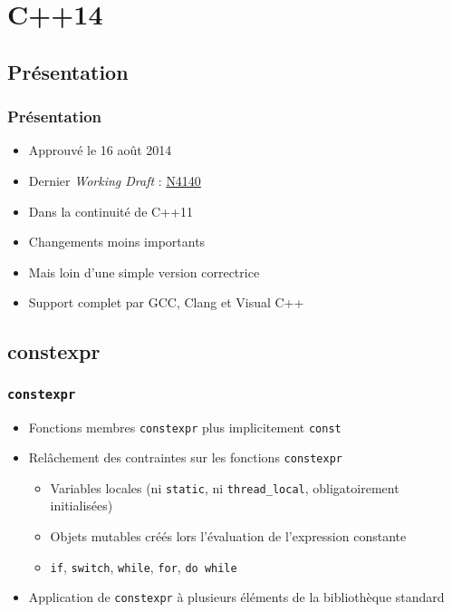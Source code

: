 \documentclass[C++.tex]{subfiles}
\begin{document}
\section{C++14}
\subsection*{Présentation}
\begin{frame}
	\frametitle{Présentation}
	\begin{itemize}
		\item Approuvé le 16 août 2014
		\item Dernier \textit{Working Draft} : \href{https://timsong-cpp.github.io/cppwp/n4140/draft.pdf}{N4140}
		\item Dans la continuité de C++11
		\item Changements moins importants
		\item Mais loin d'une simple version correctrice
		\item Support complet par GCC, Clang et Visual C++
	\end{itemize}
\end{frame}

\subsection*{constexpr}
\begin{frame}[fragile]
	\frametitle{\lstinline|constexpr|}
	\begin{itemize}
		\item Fonctions membres \lstinline|constexpr| plus implicitement \lstinline|const|
		\item Relâchement des contraintes sur les fonctions \lstinline|constexpr|
		\begin{itemize}
			\item Variables locales (ni \lstinline|static|, ni \lstinline|thread_local|, obligatoirement initialisées)
			\item Objets mutables créés lors l'évaluation de l'expression constante
			\item \lstinline|if|, \lstinline|switch|, \lstinline|while|, \lstinline|for|, \lstinline|do while|
		\end{itemize}
		\item Application de \lstinline|constexpr| à plusieurs éléments de la bibliothèque standard
	\end{itemize}
\end{frame}
\end{document}
